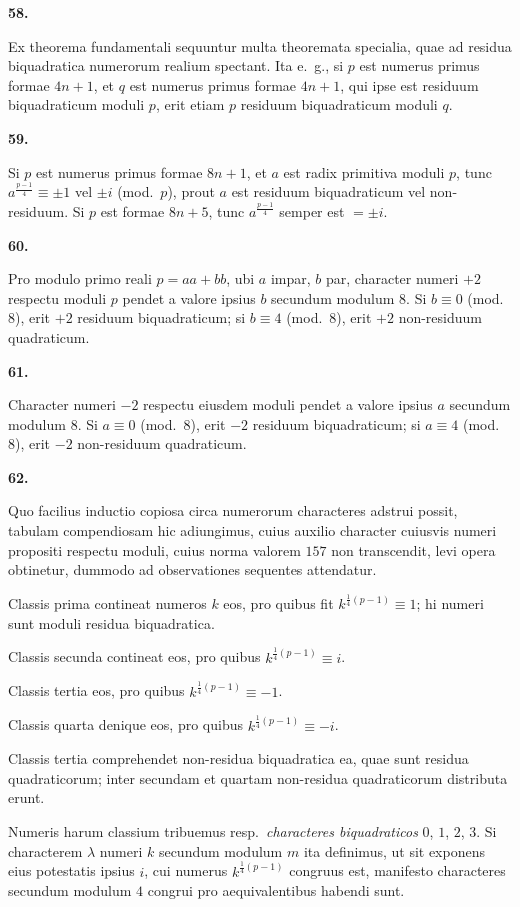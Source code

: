 \documentclass[12pt,a4paper]{article}
\newcommand{\art}[1]{\begin{center}\textbf{#1.}\end{center}}
\begin{document}
\art{58}

Ex theorema fundamentali sequuntur multa theoremata specialia, quae ad residua biquadratica numerorum realium spectant. Ita e.~g., si $p$ est numerus primus formae $4n+1$, et $q$ est numerus primus formae $4n+1$, qui ipse est residuum biquadraticum moduli $p$, erit etiam $p$ residuum biquadraticum moduli $q$.

\art{59}

Si $p$ est numerus primus formae $8n+1$, et $a$ est radix primitiva moduli $p$, tunc $a^{\frac{p-1}{4}}\equiv \pm 1$ vel $\pm i$ (mod.~$p$), prout $a$ est residuum biquadraticum vel non-residuum. Si $p$ est formae $8n+5$, tunc $a^{\frac{p-1}{4}}$ semper est $=\pm i$.

\art{60}

Pro modulo primo reali $p=aa+bb$, ubi $a$ impar, $b$ par, character numeri $+2$ respectu moduli $p$ pendet a valore ipsius $b$ secundum modulum $8$. Si $b\equiv 0$ (mod.~$8$), erit $+2$ residuum biquadraticum; si $b\equiv 4$ (mod.~$8$), erit $+2$ non-residuum quadraticum.

\art{61}

Character numeri $-2$ respectu eiusdem moduli pendet a valore ipsius $a$ secundum modulum $8$. Si $a\equiv 0$ (mod.~$8$), erit $-2$ residuum biquadraticum; si $a\equiv 4$ (mod.~$8$), erit $-2$ non-residuum quadraticum.

\art{62}

Quo facilius inductio copiosa circa numerorum characteres adstrui possit, tabulam compendiosam hic adiungimus, cuius auxilio character cuiusvis numeri propositi respectu moduli, cuius norma valorem $157$ non transcendit, levi opera obtinetur, dummodo ad observationes sequentes attendatur.

Classis prima contineat numeros $k$ eos, pro quibus fit $k^{\frac{1}{4}(p-1)}\equiv 1$; hi numeri sunt moduli residua biquadratica.

Classis secunda contineat eos, pro quibus $k^{\frac{1}{4}(p-1)}\equiv i$.

Classis tertia eos, pro quibus $k^{\frac{1}{4}(p-1)}\equiv -1$.

Classis quarta denique eos, pro quibus $k^{\frac{1}{4}(p-1)}\equiv -i$.

Classis tertia comprehendet non-residua biquadratica ea, quae sunt residua quadraticorum; inter secundam et quartam non-residua quadraticorum distributa erunt.

Numeris harum classium tribuemus resp.\ \textit{characteres biquadraticos} $0$, $1$, $2$, $3$. Si characterem $\lambda$ numeri $k$ secundum modulum $m$ ita definimus, ut sit exponens eius potestatis ipsius $i$, cui numerus $k^{\frac{1}{4}(p-1)}$ congruus est, manifesto characteres secundum modulum $4$ congrui pro aequivalentibus habendi sunt.
\end{document}
